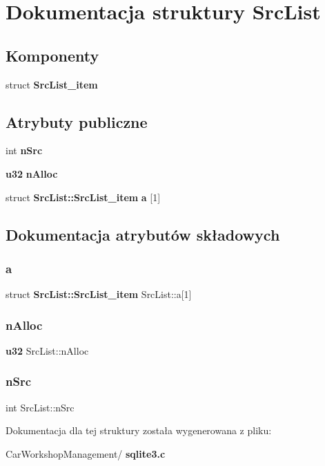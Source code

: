 \section{Dokumentacja struktury Src\+List}
\label{struct_src_list}
\subsection*{Komponenty}
\begin{DoxyCompactItemize}
\item 
struct \textbf{ Src\+List\+\_\+item}
\end{DoxyCompactItemize}
\subsection*{Atrybuty publiczne}
\begin{DoxyCompactItemize}
\item 
int \textbf{ n\+Src}
\item 
\textbf{ u32} \textbf{ n\+Alloc}
\item 
struct \textbf{ Src\+List\+::\+Src\+List\+\_\+item} \textbf{ a} [1]
\end{DoxyCompactItemize}


\subsection{Dokumentacja atrybutów składowych}
\mbox{\label{struct_src_list_acd181938f7144b40022b28072247aa3d}} 
\subsubsection{a}
{\footnotesize\ttfamily struct \textbf{ Src\+List\+::\+Src\+List\+\_\+item}  Src\+List\+::a[1]}

\mbox{\label{struct_src_list_ab9c572bef9144ab245f7f46bc5b82a61}} 
\subsubsection{nAlloc}
{\footnotesize\ttfamily \textbf{ u32} Src\+List\+::n\+Alloc}

\mbox{\label{struct_src_list_a8ecf9cced910877d93210ace66365ec8}} 
\subsubsection{nSrc}
{\footnotesize\ttfamily int Src\+List\+::n\+Src}



Dokumentacja dla tej struktury została wygenerowana z pliku\+:\begin{DoxyCompactItemize}
\item 
Car\+Workshop\+Management/\textbf{ sqlite3.\+c}\end{DoxyCompactItemize}
